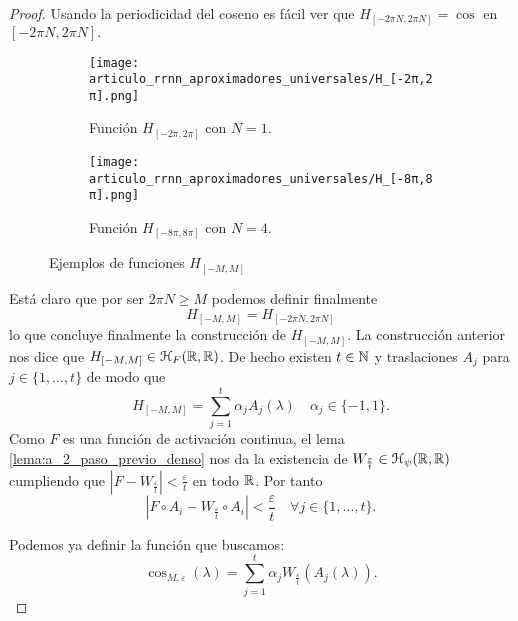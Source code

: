 \begin{proof}
    Usando la periodicidad del coseno es fácil ver que 
    $H_{[-2\pi N, 2 \pi N]} = \cos$ en $[-2\pi N, 2 \pi N].$
      \begin{figure}[h]
        \centering
        \begin{subfigure}[b]{0.45\textwidth}
            \centering
            \texttt{[image: articulo\_rrnn\_aproximadores\_universales/H\_[-2π,2π].png]}
            \caption{Función $H_{[-2\pi, 2\pi]}$ con $N=1$.}
            \label{fig:H_con_M}
        \end{subfigure}
        \hfill
        \begin{subfigure}[b]{0.45\textwidth}
            \centering
            \texttt{[image: articulo\_rrnn\_aproximadores\_universales/H\_[-8π,8π].png]}
            \caption{Función $H_{[-8\pi, 8\pi]}$ con $N=4$. }
        \end{subfigure}
        \hfill
        \caption{Ejemplos de funciones $H_{[-M, M]}$}
    \end{figure}

    Está claro que por ser $2 \pi N \geq M$ podemos definir 
    finalmente 
    \begin{equation}
        H_{[-M, M]} = H_{[-2\pi N, 2 \pi N]}
    \end{equation}
    lo que concluye finalmente la construcción de $H_{[-M, M]}.$
    La construcción anterior nos dice que 
    $H_{[-M, M]} \in \mathcal{H}_F{(\mathbb{R}, \mathbb{R})}$. 
    De hecho existen $t \in \mathbb{N}$ y traslaciones $A_j$ para 
    $j \in \{1, \ldots, t\}$ de modo que 
    \begin{equation}
        H_{[-M, M]} = \sum_{j=1}^t \alpha_j A_j(\lambda) 
        \quad 
        \alpha_j \in \{-1,1\}. 
    \end{equation}
    Como $F$ es una función de activación continua, el lema \ref{lema:a_2_paso_previo_denso}
    nos da la existencia de 
    $W_\frac{\varepsilon}{t} \in \mathcal{H}_\psi{(\mathbb{R}, \mathbb{R})}$ cumpliendo que 
    $|F - W_{ \frac{\varepsilon}{t}} | < \frac{\varepsilon}{t}$ en todo $\mathbb{R}$.
    Por tanto 
    \begin{equation}
        |F \circ A_i - W_{ \frac{\varepsilon}{t}} \circ A_i |
         < \frac{\varepsilon}{t}
         \quad 
         \forall j \in \{1, \ldots, t\}
         . 
    \end{equation}

Podemos ya definir la función que buscamos: 
    \begin{equation}
        \cos_{M, \varepsilon}(\lambda) = \sum_{j=1}^t 
        \alpha_j  W_{ \frac{\varepsilon}{t}}(A_j(\lambda)). 
    \end{equation}


\end{proof}
